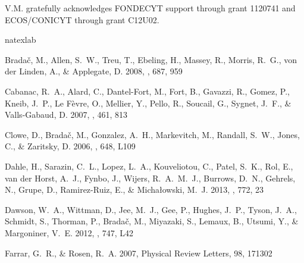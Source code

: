 \documentclass{emulateapj}
\begin{document}
V.M. gratefully acknowledges FONDECYT support through grant 1120741
and ECOS/CONICYT through grant C12U02. 




% 
\begin{thebibliography}{24}
\expandafter\ifx\csname natexlab\endcsname\relax\def\natexlab#1{#1}\fi

{Brada{\v c}}, M., {Allen}, S.~W., {Treu}, T., {Ebeling}, H., {Massey}, R.,
  {Morris}, R.~G., {von der Linden}, A., \& {Applegate}, D. 2008, \apj, 687,
  959

{Cabanac}, R.~A., {Alard}, C., {Dantel-Fort}, M., {Fort}, B., {Gavazzi}, R.,
  {Gomez}, P., {Kneib}, J.~P., {Le F{\`e}vre}, O., {Mellier}, Y., {Pello}, R.,
  {Soucail}, G., {Sygnet}, J.~F., \& {Valls-Gabaud}, D. 2007, \aap, 461, 813

{Clowe}, D., {Brada{\v c}}, M., {Gonzalez}, A.~H., {Markevitch}, M., {Randall},
  S.~W., {Jones}, C., \& {Zaritsky}, D. 2006, \apjl, 648, L109

{Dahle}, H., {Sarazin}, C.~L., {Lopez}, L.~A., {Kouveliotou}, C., {Patel},
  S.~K., {Rol}, E., {van der Horst}, A.~J., {Fynbo}, J., {Wijers}, R.~A.~M.~J.,
  {Burrows}, D.~N., {Gehrels}, N., {Grupe}, D., {Ramirez-Ruiz}, E., \&
  {Micha{\l}owski}, M.~J. 2013, \apj, 772, 23

{Dawson}, W.~A., {Wittman}, D., {Jee}, M.~J., {Gee}, P., {Hughes}, J.~P.,
  {Tyson}, J.~A., {Schmidt}, S., {Thorman}, P., {Brada{\v c}}, M., {Miyazaki},
  S., {Lemaux}, B., {Utsumi}, Y., \& {Margoniner}, V.~E. 2012, \apjl, 747, L42

{Farrar}, G.~R., \& {Rosen}, R.~A. 2007, Physical Review Letters, 98, 171302


\end{thebibliography}
\end{document}
